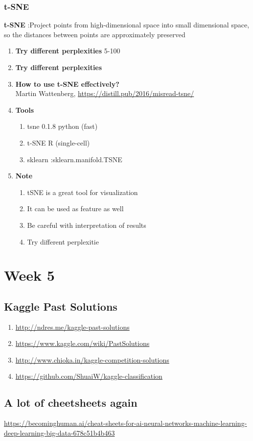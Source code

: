 \documentclass[11pt, twoside]{article}   	%
\begin{document}
\subsubsection{t-SNE}
\textbf{t-SNE} :Project points from high-dimensional space into small dimensional space, so the distances between points are approximately preserved 
\begin{enumerate}

    \item \textbf{Try different perplexities} 5-100
    \item \textbf{Try different perplexities}
    \item  \textbf{How to use t-SNE effectively?}
   \\Martin Wattenberg, \url{https://distill.pub/2016/misread-tsne/}
     \item \textbf{Tools}
         \begin{enumerate}
        \item tsne 0.1.8 python (fast)
        \item t-SNE R (single-cell)
         \item sklearn :sklearn.manifold.TSNE
          \end{enumerate}
       \item \textbf{Note}
     \begin{enumerate}
        \item tSNE is a great tool for visualization
        \item It can be used as feature as well
        \item Be careful with interpretation of results
        \item Try different perplexitie
       \end{enumerate}

 
  \end{enumerate}

\pagebreak
\section{Week 5}
\subsection{Kaggle Past Solutions}
\begin{enumerate}
    \item \url{http://ndres.me/kaggle-past-solutions}
    \item \url{https://www.kaggle.com/wiki/PastSolutions}
    \item \url{http://www.chioka.in/kaggle-competition-solutions}
    \item \url{https://github.com/ShuaiW/kaggle-classification}
 \end{enumerate}    

\subsection{A lot of cheetsheets again}
\url{https://becominghuman.ai/cheat-sheets-for-ai-neural-networks-machine-learning-deep-learning-big-data-678c51b4b463}
\end{document}
